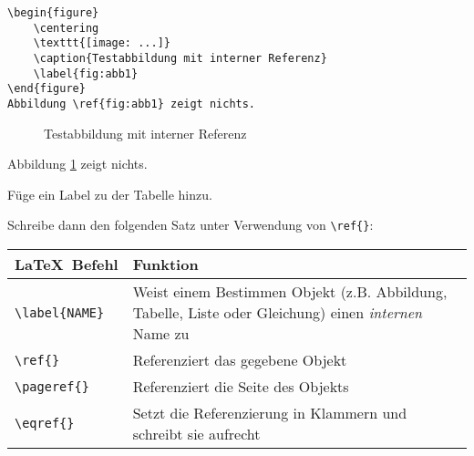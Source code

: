 \documentclass["WS\space 16-17\space -\space LaTeX-Kurs\space -\space Praesentation\space -\space 3.tex"]{subfiles}
\begin{document}
\begin{frame}[fragile]
	\Code
	\begin{lstlisting}
\begin{figure}
	\centering
	\texttt{[image: ...]}
	\caption{Testabbildung mit interner Referenz}
	\label{fig:abb1}
\end{figure}	
Abbildung \ref{fig:abb1} zeigt nichts.		
	\end{lstlisting}

	\Ausgabe
	\begin{outputbox}
		\vspace{1cm}
		\begin{figure}
			\centering
			\caption{Testabbildung mit interner Referenz}
			\label{fig:abb1}
		\end{figure}
		\vspace{-1cm}
		Abbildung \ref{fig:abb1} zeigt nichts.	
	\end{outputbox}
\end{frame}
\begin{frame}[fragile]
	\begin{Aufgabe}
		Füge ein Label zu der Tabelle  hinzu.
		
		Schreibe dann den folgenden Satz unter Verwendung von \lstinline[basicstyle=\normalfont\ttfamily\normalsize]|\ref{}|:
		
		\textrm{}
	\end{Aufgabe}

	\btVFill\Befehle
	\begin{center}
		\begin{tabular}{lp{6cm}}
			\toprule
			\LaTeX\ Befehl					&	Funktion					\\ \midrule
			\lstinline|\label{NAME}|		&	Weist einem Bestimmen Objekt (z.B. Abbildung, Tabelle, Liste oder Gleichung) einen \emph{internen} Name zu		\\
			\lstinline|\ref{}|				&	Referenziert das gegebene Objekt								\\
			\lstinline|\pageref{}|			&	Referenziert die Seite des Objekts								\\
			\lstinline|\eqref{}|			&	Setzt die Referenzierung in Klammern und schreibt sie aufrecht	\\
			\bottomrule
		\end{tabular}
	\end{center}
	\vspace{0.1cm}
\end{frame}
\end{document}
